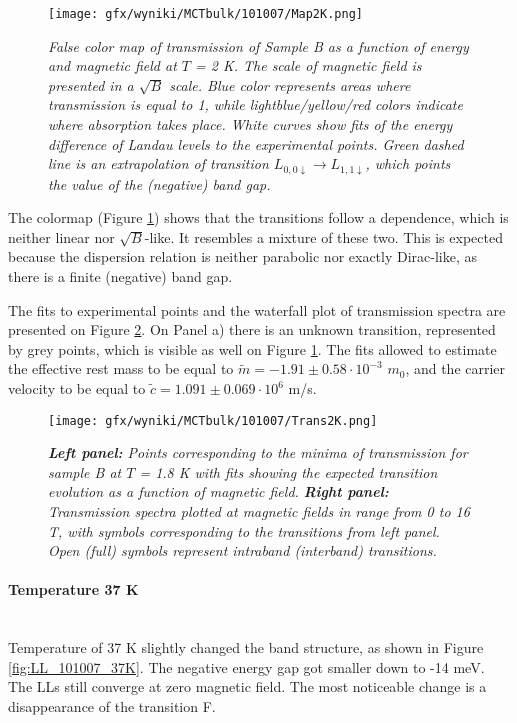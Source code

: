\documentclass[titlepage,a4paper]{book}
\newcommand{\wciecie}{\quad\phantom{v}}
\newcommand{\myparagraph}[1]{\paragraph{#1}\mbox{}\\}
\begin{document}
\begin{figure}[H]
	\centering
	\texttt{[image: gfx/wyniki/MCTbulk/101007/Map2K.png]}
	\vspace{-10pt}
	\caption{\textit{False color map of transmission of Sample B as a function of energy and magnetic field at $T$ = 2 K. The scale of magnetic field is presented in a $\sqrt{B}$ scale. Blue color represents areas where transmission is equal to 1, while lightblue/yellow/red colors indicate where absorption takes place. White curves show fits of the energy difference of Landau levels to the experimental points. Green dashed line is an extrapolation of transition $L_{0,0\downarrow}\rightarrow L_{1,1\downarrow}$, which points the value of the (negative) band gap.}}
	\label{fig:Map_101007_2K}
\end{figure} 



The colormap (Figure \ref{fig:Map_101007_2K}) shows that the transitions follow a dependence, which is neither linear nor  $\sqrt{B}$-like. It resembles a mixture of these two. This is expected because the dispersion relation is neither parabolic nor exactly Dirac-like, as there is a finite (negative) band gap. 

The fits to experimental points and the waterfall plot of transmission spectra are presented on Figure \ref{fig:Spectra_101007_2K}. On Panel a) there is an unknown transition, represented by grey points, which is visible as well on Figure \ref{fig:Map_101007_2K}. The fits allowed to estimate the effective rest mass to be equal to $\tilde m = -1.91 \pm 0.58 \cdot 10^{-3}$ $m_0$, and the carrier velocity to be equal to $\tilde{c} = 1.091 \pm 0.069 \cdot 10^6$ m/s. 

\begin{figure}[H]
	\centering
	\texttt{[image: gfx/wyniki/MCTbulk/101007/Trans2K.png]}
	\vspace{-10pt}
	\caption{\textit{\textbf{Left panel:} Points corresponding to the minima of transmission for sample B at $T$ = 1.8 K with fits showing the expected transition evolution as a function of magnetic field. \textbf{Right panel:} Transmission spectra plotted at magnetic fields in range from 0 to 16 T, with symbols corresponding to the transitions from left panel. Open (full) symbols represent intraband (interband) transitions.}}
	\label{fig:Spectra_101007_2K}
\end{figure} 

\myparagraph{Temperature 37 K}
\wciecie
Temperature of 37 K slightly changed the band structure, as shown in Figure \ref{fig:LL_101007_37K}. The negative energy gap got smaller down to -14 meV. The LLs still converge at zero magnetic field. The most noticeable change is a disappearance of the transition F. 
\end{document}
